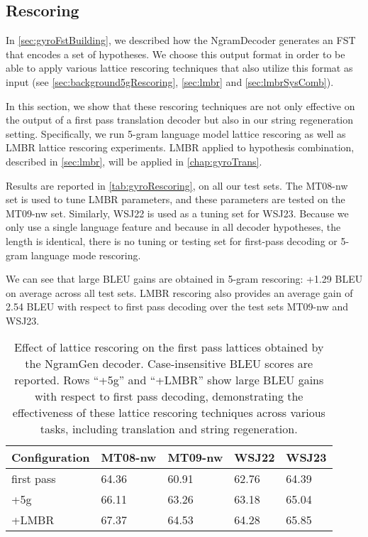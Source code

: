 \subsection{Rescoring}
\label{gyro:rescoring}

In \autoref{sec:gyroFstBuilding}, we described how the NgramDecoder
generates an FST that encodes a set of hypotheses.
We choose this output format in order to be able to apply
various lattice rescoring techniques that also utilize this format
as input (see \autoref{sec:background5gRescoring}, \autoref{sec:lmbr}
and \autoref{sec:lmbrSysComb}).

In this section, we show that these rescoring techniques
are not only effective on the output of a first pass translation decoder
but also in our string regeneration setting.
Specifically, we run 5-gram language model lattice rescoring as well
as LMBR lattice rescoring experiments. LMBR applied to hypothesis combination,
described in \autoref{sec:lmbr}, will be applied in \autoref{chap:gyroTrans}.

Results are reported in \autoref{tab:gyroRescoring}, on all our test sets.
The MT08-nw set is used to tune LMBR parameters, and these parameters are
tested on the MT09-nw set. Similarly, WSJ22 is used as a tuning set for WSJ23.
Because we only use a single language feature and because in all decoder
hypotheses, the length is identical, there is no tuning or testing set
for first-pass decoding or 5-gram language mode rescoring.

We can see that large BLEU gains are obtained in 5-gram rescoring: +1.29 BLEU
on average across all test sets. LMBR rescoring also provides
an average gain of 2.54 BLEU with respect to first pass decoding over the
test sets MT09-nw and WSJ23.
%
\begin{table}
  \begin{center}
  \begin{tabular}{l|l|l|l|l}
    Configuration & MT08-nw & MT09-nw & WSJ22 & WSJ23 \\
    \hline
    first pass & 64.36 & 60.91 & 62.76 & 64.39 \\
    +5g       & 66.11 & 63.26 & 63.18 & 65.04 \\
    +LMBR     & 67.37 & 64.53 & 64.28 & 65.85 \\
  \end{tabular}
  \caption{Effect of lattice rescoring on the first pass lattices obtained
    by the NgramGen decoder. Case-insensitive BLEU scores are reported.
    Rows ``+5g'' and ``+LMBR'' show large BLEU gains with respect to
    first pass decoding, demonstrating the effectiveness of these lattice
    rescoring techniques across various tasks, including translation and
    string regeneration.}
  \label{tab:gyroRescoring}
  \end{center}
\end{table}

